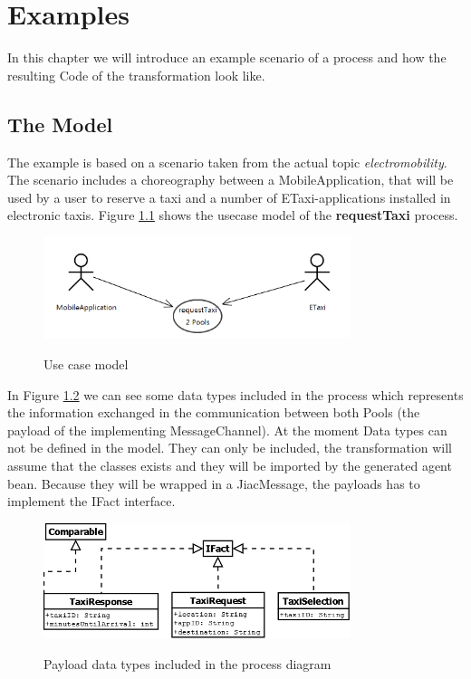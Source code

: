 \chapter{Examples}
\label{chap:examples}

In this chapter we will introduce an example scenario of a process and how the resulting Code of the transformation look like.

\section{The Model}
The example is based on a scenario taken from the actual topic \textit{electromobility}. The scenario includes a choreography between a MobileApplication, that will be used by a user to reserve a taxi and a number of ETaxi-applications installed in electronic taxis. Figure \ref{fig:usecase} shows the usecase model of the \textbf{requestTaxi} process. 
\begin{figure}[h]
	\centering
		\includegraphics[width=0.8\textwidth]{images/example/usecase.png}
	\label{fig:usecase}
	\caption{Use case model}
\end{figure}

In Figure \ref{fig:payloads} we can see some data types included in the process which represents the information exchanged in the communication between both Pools (the payload of the implementing MessageChannel). At the moment Data types can not be defined in the model. They can only be included, the transformation will assume that the classes exists and they will be imported by the generated agent bean. Because they will be wrapped in a JiacMessage, the payloads has to implement the IFact interface.
\begin{figure}[h]
	\centering
		\includegraphics[width=0.8\textwidth]{images/example/payloads.png}
	\label{fig:payloads}
	\caption{Payload data types included in the process diagram}
\end{figure}


